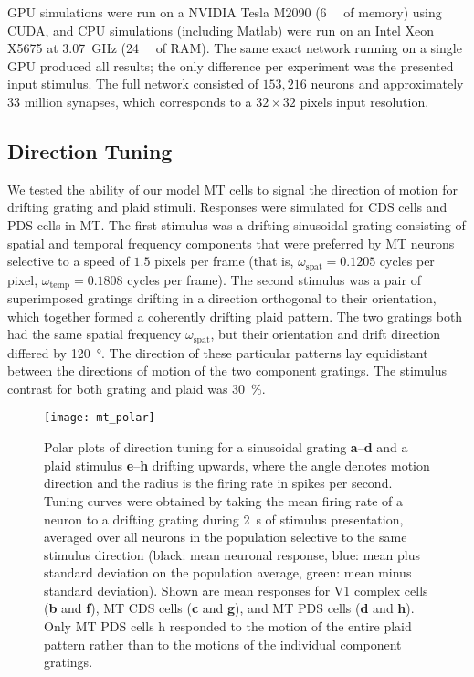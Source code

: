 \ac{GPU} simulations were run on a NVIDIA Tesla M2090
(\SI{6}{\giga\byte} of memory) using \ac{CUDA}, 
and \ac{CPU} simulations (including Matlab) 
were run on an Intel Xeon X5675 at
\SI{3.07}{\giga\hertz} (\SI{24}{\giga\byte} of \ac{RAM}). 
The same exact network running
on a single \ac{GPU} produced all results; the only difference per
experiment was the presented input stimulus. The full network
consisted of $153,216$ neurons and approximately $33$ million
synapses, which corresponds to a $32\times32$ pixels input
resolution.


\subsection{Direction Tuning}
\label{sec:MT|results|direction}
We tested the ability of our model \ac{MT} cells to signal the
direction of motion for drifting grating and plaid stimuli.
Responses were simulated for \ac{CDS} cells and \ac{PDS} cells in
\ac{MT}. The first stimulus was a drifting sinusoidal grating
consisting of spatial and temporal frequency components that
were preferred by \ac{MT} neurons selective to a speed of $1.5$
pixels per frame (that is, 
$\omega_\textrm{spat}=0.1205$ cycles per pixel,
$\omega_\textrm{temp}=0.1808$ cycles per frame). 
The second stimulus was a pair of
superimposed gratings drifting in a direction orthogonal to
their orientation, which together formed a coherently drifting
plaid pattern. The two gratings both had the same spatial
frequency $\omega_\textrm{spat}$, 
but their orientation and drift direction differed
by \SI{120}{\degree}. The direction of these particular patterns lay
equidistant between the directions of motion of the two component
gratings. The stimulus contrast for both grating and
plaid was \SI{30}{\percent}.

\begin{figure}[t]
  \centering
  \texttt{[image: mt\_polar]}
  \caption{
  Polar plots of direction tuning for a sinusoidal grating 
  \textbf{a}--\textbf{d} and a plaid stimulus \textbf{e}--\textbf{h}
  drifting upwards, where the angle denotes motion direction and the 
  radius is the firing rate in spikes per second. 
  Tuning curves were obtained by taking the mean firing rate of a 
  neuron to a drifting grating during \SI{2}{\second} of stimulus
  presentation, averaged over all neurons in the population selective 
  to the same stimulus direction (black: mean neuronal response, 
  blue: mean plus standard deviation on the population average, 
  green: mean minus standard deviation). Shown are
  mean responses for \ac{V1} complex cells (\textbf{b} and \textbf{f}),
  \ac{MT} \ac{CDS} cells (\textbf{c} and \textbf{g}),
  and \ac{MT} \ac{PDS} cells (\textbf{d} and \textbf{h}). 
  Only \ac{MT} \ac{PDS} cells h responded to the motion of the entire 
  plaid pattern rather than to the motions of the individual 
  component gratings.}
  \label{fig:MT|polar}
\end{figure}

